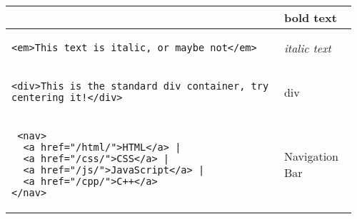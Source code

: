 \documentclass[main.tex,fontsize=8pt,paper=a4,paper=portrait,DIV=calc,]{scrartcl}
\begin{document}
\begin{table}[h!]
\begin{tabular}{|m{0.755\linewidth}|m{0.2\linewidth}|}
& \textbf{bold text}\\
\hline
\begin{lstlisting}
<em>This text is italic, or maybe not</em>
\end{lstlisting}
& \emph{italic text}\\
\hline
\begin{lstlisting}
<div>This is the standard div container, try centering it!</div>
\end{lstlisting}
&
div
\\
\hline
\begin{lstlisting}
 <nav>
  <a href="/html/">HTML</a> |
  <a href="/css/">CSS</a> |
  <a href="/js/">JavaScript</a> |
  <a href="/cpp/">C++</a>
</nav>
\end{lstlisting}
&
Navigation Bar
\\
\hline
\end{tabular}
\end{table}
\pagebreak
\end{document}

